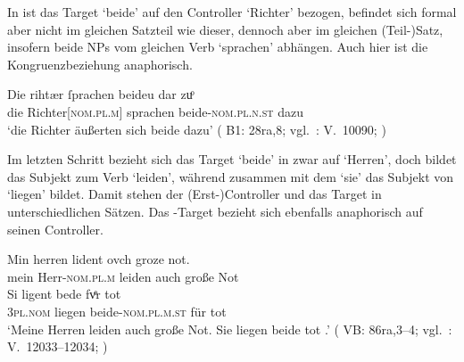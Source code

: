 
In  ist das Target  `beide' auf den
Controller  `Richter' bezogen, befindet sich formal aber nicht im
gleichen Satzteil wie dieser, dennoch aber im gleichen (Teil-)Satz, insofern
beide NPs vom gleichen Verb  `sprachen' abhängen. Auch hier ist
die Kongruenzbeziehung anaphorisch.

\begin{exe}
\ex \label{ex:beidedomains_3}
	\gll Die rihtær ſprachen beideu {dar zuͦ} \\
		die Richter[\textsc{nom.pl.m}] sprachen beide-\textsc{nom.pl.n.st}
			dazu \\
	\trans `die Richter äußerten sich beide dazu'
		(%
			B1: 28ra,8;
			vgl.~\KC: V.~10090; \cite[267]{schroeder1895}%
		)
\end{exe}

Im letzten Schritt bezieht sich das Target  `beide' in
 zwar auf  `Herren', doch bildet
 das Subjekt zum Verb  `leiden', während
 zusammen mit dem   `sie' das Subjekt
von  `liegen' bildet. Damit stehen der (Erst-)Controller
 und das Target  in unterschiedlichen Sätzen. Das
-Target bezieht sich ebenfalls anaphorisch auf seinen
Controller.

\begin{exe}
	\ex \label{ex:beidedomains_4}
		\gll Min herren lident ovch groze not. \\
			mein Herr-\textsc{nom.pl.m} leiden auch große Not \\
	\sn \gll Si ligent bede fvͤr tot \\
			\textsc{3pl\subM.nom} liegen beide-\textsc{nom.pl.m.st} für tot \\
	\trans `Meine Herren leiden auch große Not. Sie liegen beide tot
		.'
		(%
			VB: 86ra,3--4;
			vgl.~\KC: V.~12033--12034; \cite[301]{schroeder1895}%
		)		
\end{exe}

